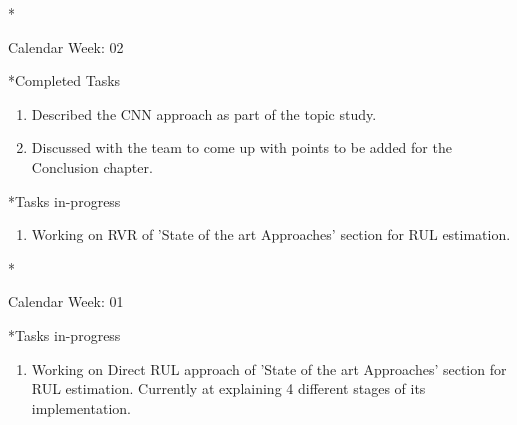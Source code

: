 \documentclass[11pt,a4paper]{article}
\begin{document}
\newpage
\begin{section}*{Calendar Week: 02  \hfill \date{15 January, 2021}}
 \begin{refsection}
     \begin{subsection}*{Completed Tasks}
         \begin{enumerate}
             \item
                   Described the CNN approach as part of the topic study.
             \item
                   Discussed with the team to come up with points to be added for the Conclusion chapter.
         \end{enumerate}
     \end{subsection}
     \begin{subsection}*{Tasks in-progress}
         \begin{enumerate}
             \item
                   Working on RVR of 'State of the art Approaches' section for RUL estimation.
         \end{enumerate}
     \end{subsection}
 \end{refsection}
\end{section}

\newpage
\begin{section}*{Calendar Week: 01  \hfill \date{8 January, 2021}}
 \begin{refsection}
     \begin{subsection}*{Tasks in-progress}
         \begin{enumerate}
             \item
                   Working on Direct RUL approach of 'State of the art Approaches' section for RUL estimation. Currently at explaining 4 different stages of its implementation. \cite{khelif2016direct}
         \end{enumerate}
     \end{subsection}
     \printbibliography
 \end{refsection}
\end{section}
\end{document}
